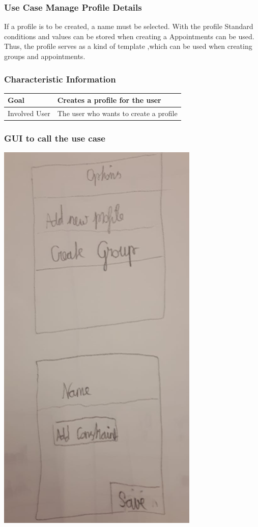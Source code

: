 \documentclass[12pt]{scrartcl}
\begin{document}
    \subsubsection{Use Case Manage Profile Details}    
        If a profile is to be created, a name must be selected. With the profile
        Standard conditions and values ​​can be stored when creating a
        Appointments can be used. Thus, the profile serves as a kind of template
        ,which can be used when creating groups and appointments.
    \subsubsection{Characteristic Information} 
        \begin{tabular}{|l|l|}
            \hline
            Goal & Creates a profile for the user \\ \hline
            Involved User & The user who wants to create a profile \\ \hline
        \end{tabular}
    \subsubsection{GUI to call the use case}
        \includegraphics[scale=.4]{Materials/Images/add_profile.png} 
\end{document}
